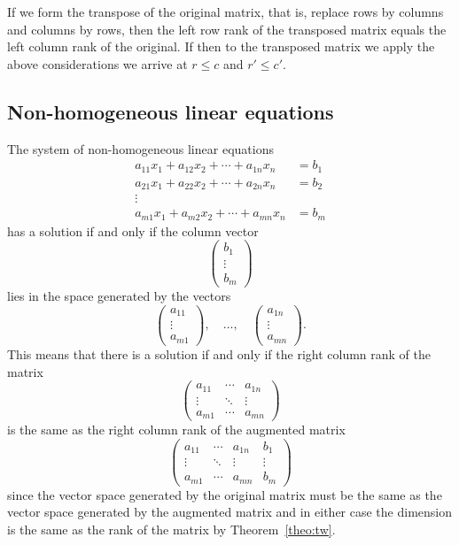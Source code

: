 \documentclass[10pt,leqno]{article}
\theoremstyle{definition}
\begin{document}
If we form the transpose of the original matrix, that is, replace rows by columns and columns by rows, then the left row rank of the transposed matrix equals the left column rank of the original.
If then to the transposed matrix we apply the above considerations we arrive at $r \leq c$ and $r' \leq c'$.



\subsection{Non-homogeneous linear equations}

The system of non-homogeneous linear equations
\begin{equation}
\label{eq:Etw}
\begin{aligned}
a_{11}x_1 + a_{12}x_2 + \cdots + a_{1n}x_n &= b_1
\\
a_{21}x_1 + a_{22}x_2 + \cdots + a_{2n}x_n &= b_2
\\
\vdots &
\\
a_{m1}x_1 + a_{m2}x_2 + \cdots + a_{mn}x_n &= b_m
\end{aligned}
\end{equation}
has a solution if and only if the column vector
\[
\begin{pmatrix}
b_1 \\ \vdots \\ b_m
\end{pmatrix}
\]
lies in the space generated by the vectors
\[
\begin{pmatrix}
a_{11} \\ \vdots \\ a_{m1}
\end{pmatrix}
,\quad \ldots,\quad 
\begin{pmatrix}
a_{1n} \\ \vdots \\ a_{mn}
\end{pmatrix}.
\]
This means that there is a solution if and only if the right column rank of the matrix
\[
\begin{pmatrix}
a_{11} & \cdots & a_{1n}
\\
\vdots & \ddots & \vdots
\\
a_{m1} & \cdots & a_{mn}
\end{pmatrix}
\]
is the same as the right column rank of the augmented matrix
\[
\begin{pmatrix}
a_{11} & \cdots & a_{1n} & b_1
\\
\vdots & \ddots & \vdots & \vdots
\\
a_{m1} & \cdots & a_{mn} & b_m
\end{pmatrix}
\]
since the vector space generated by the original matrix must be the same as the vector space generated by the augmented matrix and in either case the dimension is the same as the rank of the matrix by Theorem~\ref{theo:tw}.
\end{document}
